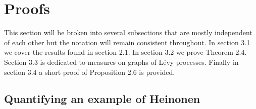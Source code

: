 \section{Proofs}

This section will be broken into several subsections that are mostly independent of each other but the notation will remain consistent throughout. In section 3.1 we cover the results found in section 2.1. In section 3.2 we prove Theorem 2.4. Section 3.3 is dedicated to measures on graphs of L\'evy processes. Finally in section 3.4 a short proof of Proposition 2.6 is provided.



\subsection{Quantifying an example of Heinonen}



